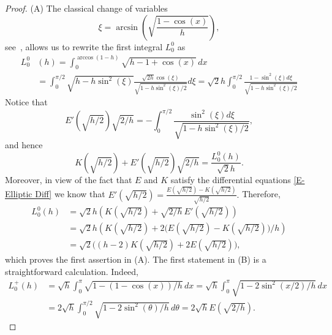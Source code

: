 \documentclass[12pt,psamsfonts]{amsart}
\begin{document}
\begin{proof}
(A)  The classical change of variables
\begin{equation*}
\label{E-cov}
    \xi = \arcsin\left(\sqrt{\frac{1-\cos(x)}{h}}\right),
\end{equation*}
see~\cite{Byrd}, allows us to rewrite the first integral $L^0 _0$ as
\begin{align*}
  L^0 _0&(h) =\int_0^{\arccos(1-h)}  \sqrt{h-1+\cos(x)} \, dx\\
                  &=\int_0^{\pi/2} \sqrt{h-h \sin^2(\xi)} \frac{\sqrt{2h}
                                             \cos(\xi)}{\sqrt{1-{h}\sin^2(\xi)/{2}}}d\xi
= \sqrt{2}h \int_0^{\pi/2} \frac{1-\sin^2(\xi)d\xi}{\sqrt{1-{h} \sin^2(\xi)/{2}}}
\end{align*}
Notice that
\begin{equation*}
\label{E-E'}
    E'\left(\sqrt{{h}/{2}} \right)\sqrt{{2}/{h}} = - \int_0^{\pi/2}
    \frac{\sin^2(\xi)d\xi}{\sqrt{1-{h} \sin^2(\xi)/{2}}},
\end{equation*}
and hence
\begin{equation*}
    K\left(\sqrt{{h}/{2}}\right) +  E'\left(\sqrt{{h}/{2}}\right)\sqrt{{2}/{h}}
        =\frac{L^0 _0(h)}{\sqrt{2}h}.
\end{equation*}
Moreover, in view of the fact that $E$ and $K$ satisfy the
differential equations \eqref{E-Elliptic Diff} we know that
    $E'\left(\sqrt{{h}/{2}}\right) =
    \frac{E(\sqrt{{h}/{2}})-K(\sqrt{{h}/{2}})}{\sqrt{{h}/{2}}}.$
Therefore,
\begin{align*}
    L^0 _0(h) &= \sqrt{2}h \left ( K(\sqrt{{h}/{2}}) + \sqrt{{2}/{h}}\, E'(\sqrt{{h}/{2}}) \right
    )\\
    &= \sqrt{2}h \left ( K(\sqrt{{h}/{2}}) +{2} \big(E(\sqrt{{h}/{2}})
                     -K(\sqrt{{h}/{2}})\big)/{h} \right )  \\
                   &= \sqrt{2} \big( (h-2)K(\sqrt{{h}/{2}}) + 2E(\sqrt{{h}/{2}}) \big),
\end{align*}
which proves the first assertion in (A). The first statement in (B)
is a straightforward calculation. Indeed,
\begin{align*}
    L^+_0(h) &=  \sqrt{h}\int_0^{\pi} \sqrt{1-(1-\cos(x))/h } \,dx=
    \sqrt{h}\int_0^{\pi} \sqrt{1-{2}\sin^2\left({x}/{2}\right)/{h}}\, dx\\
                    &= 2\sqrt{h}\int_0^{\pi/2} \sqrt{1-{2}\sin^2(\theta)/{h}}\,
                     d\theta = 2\sqrt{h} E\left(\sqrt{{2}/{h}}\right).
\end{align*}

\end{proof}
\end{document}
